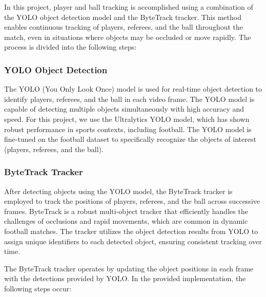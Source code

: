In this project, player and ball tracking is accomplished using a combination of the YOLO object detection model and the ByteTrack tracker. This method enables continuous tracking of players, referees, and the ball throughout the match, even in situations where objects may be occluded or move rapidly. The process is divided into the following steps:

\subsubsection{YOLO Object Detection}
The YOLO (You Only Look Once) model is used for real-time object detection to identify players, referees, and the ball in each video frame. The YOLO model is capable of detecting multiple objects simultaneously with high accuracy and speed. For this project, we use the Ultralytics YOLO model, which has shown robust performance in sports contexts, including football. The YOLO model is fine-tuned on the football dataset to specifically recognize the objects of interest (players, referees, and the ball).

\subsubsection{ByteTrack Tracker}

After detecting objects using the YOLO model, the ByteTrack tracker is employed to track the positions of players, referees, and the ball across successive frames. ByteTrack is a robust multi-object tracker that efficiently handles the challenges of occlusions and rapid movements, which are common in dynamic football matches. The tracker utilizes the object detection results from YOLO to assign unique identifiers to each detected object, ensuring consistent tracking over time.

The ByteTrack tracker operates by updating the object positions in each frame with the detections provided by YOLO. In the provided implementation, the following steps occur:

